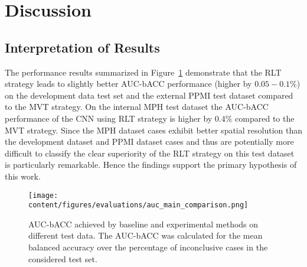 \section{Discussion}
\label{sec:discussion}

\subsection{Interpretation of Results}

The performance results summarized in Figure~\ref{fig:auc_comparison_methods_data} demonstrate 
that the RLT strategy leads to slightly better AUC-bACC performance (higher by $0.05-0.1\%$) on the development data test set 
and the external PPMI test dataset compared to the MVT strategy.
On the internal MPH test dataset the AUC-bACC performance of the CNN using RLT strategy is higher by $0.4\%$ compared to the MVT strategy.
Since the MPH dataset cases exhibit better spatial resolution than the development dataset and PPMI dataset cases
and thus are potentially more difficult to classify 
the clear superiority of the RLT strategy on this test dataset is particularly remarkable.
Hence the findings support the primary hypothesis of this work.

\begin{figure}[ht]
    \centering
    \texttt{[image: content/figures/evaluations/auc\_main\_comparison.png]}
    \caption{AUC-bACC achieved by baseline and experimental methods on different test data. 
    The AUC-bACC was calculated for the mean balanced accuracy over the percentage of inconclusive cases 
    in the considered test set.} 
    \label{fig:auc_comparison_methods_data}
\end{figure} 


